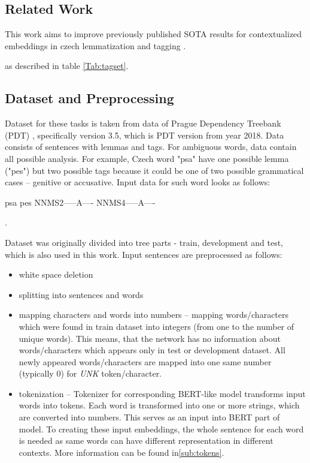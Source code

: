 \subsection{Related Work}
This work aims to improve previously published SOTA results for contextualized embeddings in czech lemmatization and tagging \citep{Straka2019}. 

as described in table \ref{Tab:tagset}.  %



\subsection{Dataset and Preprocessing}
\label{sub:dataset}
Dataset for these tasks is taken from data of Prague Dependency Treebank (PDT) \citep{PDT35}, specifically version 3.5, which is PDT version from year 2018. %
Data consists of sentences with lemmas and tags. For ambiguous words, data contain all possible analysis. For example, Czech word "psa" have one possible lemma ("pes") but two possible tags because it could be one of two possible grammatical cases -- genitive or accusative. Input data for such word looks as follows: \\
\begin{center}
psa pes NNMS2-----A---- NNMS4-----A----
\end{center}.

Dataset was originally divided into tree parts - train, development and test, which is also used in this work. Input sentences are preprocessed as follows: %
\begin{itemize}
\item white space deletion
\item splitting into sentences and words
\item mapping characters and words into numbers -- mapping  words/characters which were found in train dataset into integers (from one to the number of unique words). This means, that the network has no information about words/characters which appears only in test or development dataset. All newly appeared words/characters are mapped into one same number (typically $0$) for \textit{UNK} token/character.
\item tokenization -- Tokenizer for corresponding BERT-like model transforms input words into tokens. Each word is transformed into one or more strings, which are converted into numbers. This serves as an input into BERT part of model. To creating these input embeddings, the whole sentence for each word is needed as same words can have different representation in different contexts. More information can be found in\ref{sub:tokens}.
\end{itemize}

